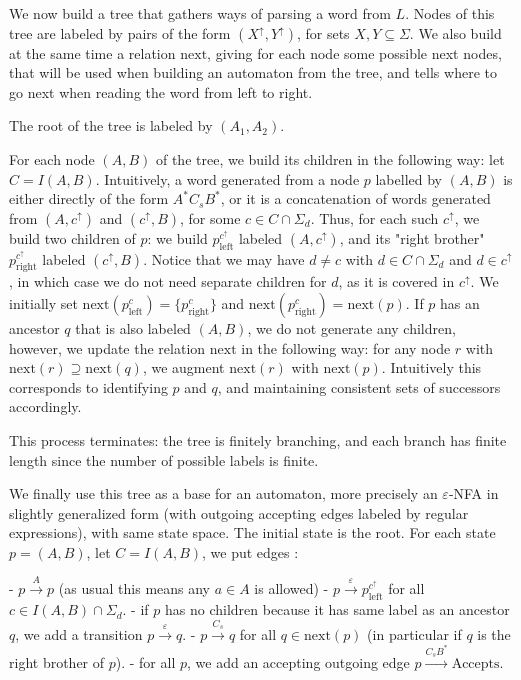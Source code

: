 \documentclass[12pt]{article}
\begin{document}
We now build a tree that gathers ways of parsing a word from $L$. Nodes of this tree are labeled by pairs of the form $(X^\uparrow,Y^\uparrow)$, for sets $X,Y\subseteq \Sigma$.
We also build at the same time a relation $\mathrm{next}$, giving for each node some possible next nodes, that will be used when building an automaton from the tree, and tells where to go next when reading the word from left to right.

The root of the tree is labeled by $(A_1,A_2)$.

For each node $(A,B)$ of the tree, we build its children in the following way: let $C=I(A,B)$. Intuitively, a word generated from a node $p$ labelled by $(A,B)$ is either directly of the form $A^*C_sB^*$, or it is a concatenation of words generated from $(A,c^\uparrow)$ and $(c^\uparrow, B)$, for some $c\in C\cap\Sigma_d$. 
Thus, for each such $c^\uparrow$, we build two children of $p$: we build  $p^{c^\uparrow}_\mathrm{left}$ labeled $(A,c^\uparrow)$, and its "right brother" $p^{c^\uparrow}_\mathrm{right}$ labeled $(c^\uparrow,B)$. Notice that we may have $d\neq c$ with $d\in C\cap\Sigma_d$ and $d\in c^\uparrow$, in which case we do not need separate children for $d$, as it is covered in $c^\uparrow$.
 We initially set $\mathrm{next}(p^c_\mathrm{left})=\{p^c_\mathrm{right}\}$ and $\mathrm{next}(p^c_\mathrm{right})=\mathrm{next}(p)$.
If $p$ has an ancestor $q$ that is also labeled $(A,B)$, we do not generate any children, however, we update the relation $\mathrm{next}$ in the following way: for any node $r$ with $\mathrm{next}(r)\supseteq\mathrm{next}(q)$, we augment $\mathrm{next}(r)$ with $\mathrm{next}(p)$. Intuitively this corresponds to identifying $p$ and $q$, and maintaining consistent sets of successors accordingly.

This process terminates: the tree is finitely branching, and each branch has finite length since the number of possible labels is finite.


We finally use this tree as a base for an automaton, more precisely an $\varepsilon$-NFA in slightly generalized form (with outgoing accepting edges labeled by regular expressions), with same state space.
The initial state is the root.
For each state $p=(A,B)$, let $C=I(A,B)$, we put edges :

 - $p\stackrel{A}{\to}p$ (as usual this means any $a\in A$ is allowed)
 - $p\stackrel{\varepsilon}{\to}p^{c^\uparrow}_\mathrm{left}$ for all $c\in I(A,B)\cap\Sigma_d$.
 - if $p$ has no children because it has same label as an ancestor $q$, we add a transition $p\stackrel{\varepsilon}{\to}q$.
 - $p\stackrel{C_s}{\to}q$ for all $q\in\mathrm{next}(p)$ (in particular if $q$ is the right brother of $p$).
 - for all $p$, we add an accepting outgoing edge $p\stackrel{C_sB^*}{\to}\text{Accepts}$.
\end{document}
